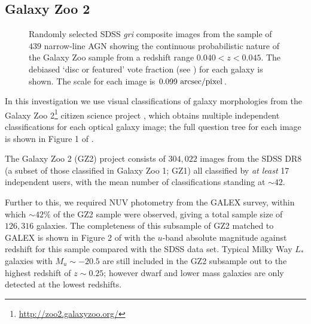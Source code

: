 \documentclass[useAMS,usenatbib]{mn2e}
\begin{document}
\subsection{Galaxy Zoo 2}\label{galzoo}

\begin{figure}
\caption{Randomly selected SDSS \emph{gri} composite images from the sample of $439$ narrow-line AGN showing the continuous probabilistic nature of the Galaxy Zoo sample from a redshift range $0.040 < z < 0.045$. The debiased `disc or featured' vote fraction (see \citealt{GZ2}) for each galaxy is shown. The scale for each image is $0.099~\rm{arcsec/pixel}$.}
\label{mosaic}
\end{figure}

In this investigation we use visual classifications of galaxy morphologies from the Galaxy Zoo 2\footnote{\url{http://zoo2.galaxyzoo.org/}} citizen science project \citep{GZ2}, which obtains multiple independent classifications for each optical galaxy image; the full question tree for each image is shown in Figure 1 of \citealt{GZ2}.  

The Galaxy Zoo 2 (GZ2) project consists of $304, 022$ images from the SDSS DR8 (a subset of those classified in Galaxy Zoo 1; GZ1) all classified by \emph{at least} 17 independent users, with the mean number of classifications standing at $\sim42$.

Further to this, we required NUV photometry from the GALEX survey, within which $\sim42\%$ of the GZ2 sample were observed, giving a total sample size of $126, 316$ galaxies. The completeness of this subsample of GZ2 matched to GALEX is shown in Figure 2 of \cite{Sme2015} with the $u$-band absolute magnitude against redshift for this sample compared with the SDSS data set. Typical Milky Way $L_*$ galaxies with $M_u \sim -20.5$ are still included in the GZ2 subsample out to the highest redshift of $z \sim 0.25$; however dwarf and lower mass galaxies are only detected at the lowest redshifts.
\end{document}
